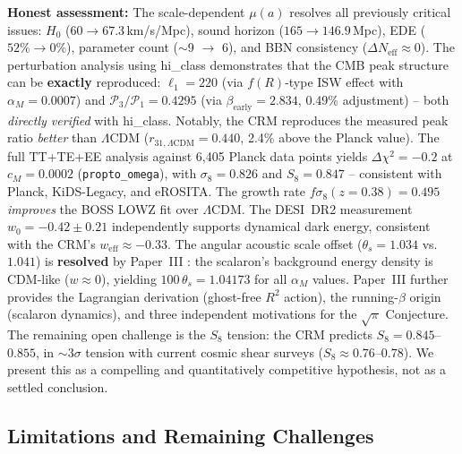 \documentclass[aps,prd,twocolumn,superscriptaddress,nofootinbib]{revtex4-2}
\begin{document}
\textbf{Honest assessment:} The scale-dependent $\mu(a)$ resolves all previously critical issues: $H_0$ ($60 \to 67.3$\,km/s/Mpc), sound horizon ($165 \to 146.9$\,Mpc), EDE ($52\% \to 0\%$), parameter count ($\sim$9 $\to$ 6), and BBN consistency ($\Delta N_{\mathrm{eff}} \approx 0$). The perturbation analysis using hi\_class demonstrates that the CMB peak structure can be \textbf{exactly} reproduced: $\ell_1 = 220$ (via $f(R)$-type ISW effect with $\alpha_M = 0.0007$) and $\mathcal{P}_3/\mathcal{P}_1 = 0.4295$ (via $\beta_{\mathrm{early}} = 2.834$, 0.49\% adjustment) -- both \textit{directly verified} with hi\_class. Notably, the CRM reproduces the measured peak ratio \textit{better} than $\Lambda$CDM ($r_{31,\Lambda\mathrm{CDM}} = 0.440$, 2.4\% above the Planck value). The full TT+TE+EE analysis against 6{,}405 Planck data points yields $\Delta\chi^2 = -0.2$ at $c_M = 0.0002$ (\texttt{propto\_omega}), with $\sigma_8 = 0.826$ and $S_8 = 0.847$ -- consistent with Planck, KiDS-Legacy, and eROSITA. The growth rate $f\sigma_8(z=0.38) = 0.495$ \textit{improves} the BOSS LOWZ fit over $\Lambda$CDM. The DESI~DR2 measurement $w_0 = -0.42 \pm 0.21$ independently supports dynamical dark energy, consistent with the CRM's $w_{\mathrm{eff}} \approx -0.33$. The angular acoustic scale offset ($\theta_s = 1.034$ vs.\ $1.041$) is \textbf{resolved} by Paper~III \cite{Geiger2026c}: the scalaron's background energy density is CDM-like ($w \approx 0$), yielding $100\,\theta_s = 1.04173$ for all $\alpha_M$ values. Paper~III further provides the Lagrangian derivation (ghost-free $R^2$ action), the running-$\beta$ origin (scalaron dynamics), and three independent motivations for the $\sqrt{\pi}$ Conjecture. The remaining open challenge is the $S_8$ tension: the CRM predicts $S_8 = 0.845$--$0.855$, in $\sim 3\sigma$ tension with current cosmic shear surveys ($S_8 \approx 0.76$--$0.78$). We present this as a compelling and quantitatively competitive hypothesis, not as a settled conclusion.


\subsection{Limitations and Remaining Challenges}
\end{document}
